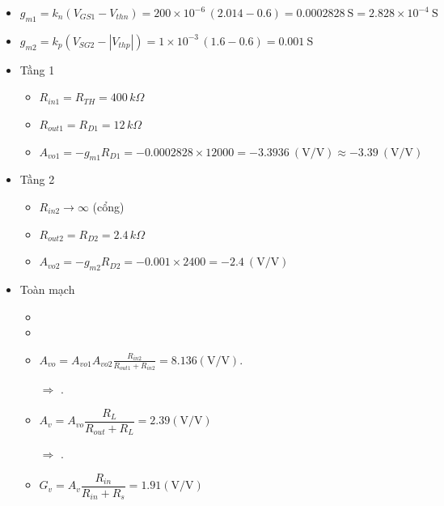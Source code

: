\begin{itemize}[label=+, leftmargin=2cm]
	\item \( g_{m1} = k_n (V_{GS1} - V_{thn})
	= 200\times 10^{-6}\,(2.014-0.6)
	= 0.0002828\ \text{S}
	= 2.828\times 10^{-4}\ \text{S} \)
	\item \( g_{m2} = k_p (V_{SG2} - |V_{thp}|)
	= 1\times 10^{-3}\,(1.6-0.6)
	= 0.001\ \text{S} \)
\end{itemize}

\begin{itemize}[label=-]
	\item Tầng 1
	\begin{itemize}[label=+, leftmargin=2cm]
		\item \( R_{in1} = R_{TH} = 400\,k\Omega \)
		\item \( R_{out1} = R_{D1} = 12\,k\Omega \)
		\item \( A_{vo1} = -g_{m1} R_{D1}
		= -0.0002828 \times 12000
		= -3.3936 \ (\text{V/V})
		\approx -3.39\ (\text{V/V}) \)
	\end{itemize}
	
	\item Tầng 2
	\begin{itemize}[label=+, leftmargin=2cm]
		\item \( R_{in2} \to \infty \) (cổng)
		\item \( R_{out2} = R_{D2} = 2.4\,k\Omega \)
		\item \( A_{vo2} = -g_{m2} R_{D2}
		= -0.001 \times 2400
		= -2.4\ (\text{V/V}) \)
	\end{itemize}
	
	\item Toàn mạch
	\begin{itemize}[label=+, leftmargin=2cm]
		\item {}
		
		\item {}
		
		\item $	A_{vo} = A_{vo1} A_{vo2}\frac{R_{in2}}{R_{out1}+R_{in2}} = 8.136 (\text{V/V}).$
		
		$\Rightarrow$ .
		
		\item $ A_{v} = A_{vo}\dfrac{R_{L}}{R_{out} + R_{L}} = 2.39 (\text{V/V})$
		
		$\Rightarrow$ .
		
		\item $G_{v} = A_{v} \dfrac{R_{in}}{R_{in} + R_{s}} = 1.91 (\text{V/V})$
		

\end{itemize}
\end{itemize}
